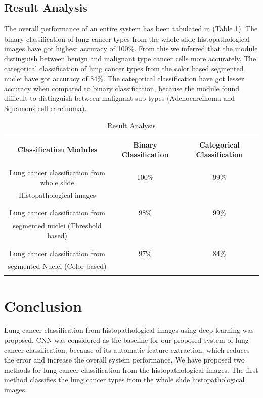 \documentclass[conference]{IEEEtran}
\begin{document}
\subsection{Result Analysis}
The overall performance of an entire system has been tabulated in (Table \ref{result analysis}). The binary classification of lung cancer types from the whole slide histopathological images have got highest accuracy of 100\%. From this we inferred that the module distinguish between benign and malignant type cancer cells more accurately. The categorical classification of lung cancer types from the color based segmented nuclei have got accuracy of 84\%. The categorical classification have got lesser accuracy when compared to binary classification, because the module found difficult to distinguish between malignant sub-types (Adenocarcinoma and Squamous cell carcinoma).
\begin{table}[h]
\footnotesize
\begin{center}
\begin{tabular}{|c|c|c|}
  \hline        
   &  & \\
   \textbf{Classification Modules}  & \textbf{Binary Classification} & \textbf{Categorical Classification} \\
   & & \\
   \hline
   & & \\
   Lung cancer classification 
   from whole slide 
    &  100\% & 99\% \\
    Histopathological images & &\\
   & & \\
   \hline
   & & \\
   Lung cancer classification
   from  & 98\% & 99\% \\
   segmented nuclei
   (Threshold based) & &\\
   &  & \\
   \hline
   & & \\
   Lung cancer classification 
   from  & 97\% & 84\%  \\
   segmented Nuclei
   (Color based) & & \\
   &  & \\
  
  \hline  
\end{tabular}
\caption{Result Analysis}
\label{result analysis}
\end{center}
\end{table}


\section*{Conclusion}
Lung cancer classification from histopathological images using deep learning was proposed. CNN was considered as the baseline for our proposed system of lung cancer classification, because of its automatic feature extraction, which reduces the error and increase the overall system performance. We have proposed two methods for lung cancer classification from the histopathological images. The first method classifies the lung cancer types from the whole slide histopathological images. 
\end{document}
